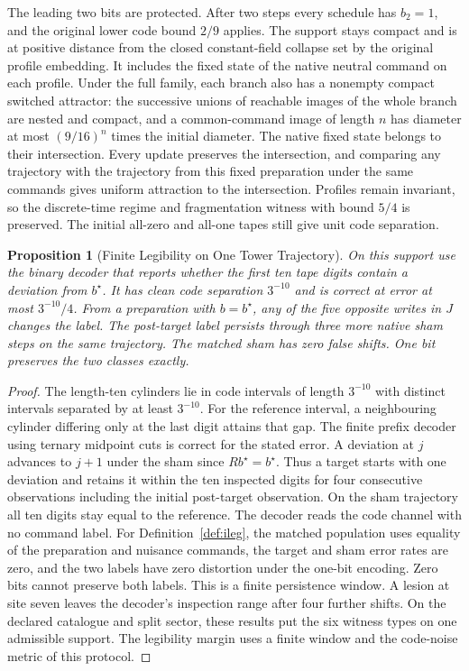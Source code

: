 \documentclass[11pt,a4paper]{article}
\newtheorem{proposition}[theorem]{Proposition}
\theoremstyle{definition}
\begin{document}
The leading two bits are protected. After two steps every schedule has $b_2=1$, and the original lower code bound $2/9$ applies. The support stays compact and is at positive distance from the closed constant-field collapse set by the original profile embedding. It includes the fixed state of the native neutral command on each profile. Under the full family, each branch also has a nonempty compact switched attractor: the successive unions of reachable images of the whole branch are nested and compact, and a common-command image of length $n$ has diameter at most $(9/16)^n$ times the initial diameter. The native fixed state belongs to their intersection. Every update preserves the intersection, and comparing any trajectory with the trajectory from this fixed preparation under the same commands gives uniform attraction to the intersection. Profiles remain invariant, so the discrete-time regime and fragmentation witness with bound $5/4$ is preserved. The initial all-zero and all-one tapes still give unit code separation.

\begin{proposition}[Finite Legibility on One Tower Trajectory]\label{prop:writable-tower-trajectory-legibility}
On this support use the binary decoder that reports whether the first ten tape digits contain a deviation from $b^\star$. It has clean code separation $3^{-10}$ and is correct at error at most $3^{-10}/4$. From a preparation with $b=b^\star$, any of the five opposite writes in $J$ changes the label. The post-target label persists through three more native sham steps on the same trajectory. The matched sham has zero false shifts. One bit preserves the two classes exactly.
\end{proposition}
\begin{proof}
The length-ten cylinders lie in code intervals of length $3^{-10}$ with distinct intervals separated by at least $3^{-10}$. For the reference interval, a neighbouring cylinder differing only at the last digit attains that gap. The finite prefix decoder using ternary midpoint cuts is correct for the stated error. A deviation at $j$ advances to $j+1$ under the sham since $Rb^\star=b^\star$. Thus a target starts with one deviation and retains it within the ten inspected digits for four consecutive observations including the initial post-target observation. On the sham trajectory all ten digits stay equal to the reference. The decoder reads the code channel with no command label. For Definition~\ref{def:ileg}, the matched population uses equality of the preparation and nuisance commands, the target and sham error rates are zero, and the two labels have zero distortion under the one-bit encoding. Zero bits cannot preserve both labels. This is a finite persistence window. A lesion at site seven leaves the decoder's inspection range after four further shifts. On the declared catalogue and split sector, these results put the six witness types on one admissible support. The legibility margin uses a finite window and the code-noise metric of this protocol.
\end{proof}
\end{document}
